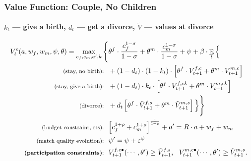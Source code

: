 \documentclass[aspectratio=169]{beamer}
\DeclareMathOperator{\E}{\mathbb{E}}
\begin{document}
\begin{frame}
\frametitle{Value Function: Couple, No Children}
\framesubtitle{$k_t$ --- give a birth, $d_t$ --- get a divorce, $\tilde{V}$ --- values at divorce}
\begin{align*}
V^{c}_t(a,w_f,w_m,\psi,\theta) = \max\limits_{c_f,c_m,a',k} \Bigg\{ & \theta^f \cdot \frac{c_f^{1-\sigma}}{{1-\sigma}}  + \theta^m \cdot \frac{c_m^{1-\sigma}}{1-\sigma}  + \psi + \beta \cdot \E_t \Big\{   \\
\text{ \footnotesize (stay, no birth): \ } & + (1-d_t) \cdot (1-k_t) \cdot  \left[ \theta^f \cdot  V^{f,c}_{t+1} + \theta^m \cdot V^{m,c}_{t+1}  \right] \\
\text{ \footnotesize (stay, give a birth): \ } &  + (1-d_t) \cdot k_t \cdot  \left[ \theta^f \cdot  V^{f,ck}_{t+1} + \theta^m \cdot V^{m,ck}_{t+1}  \right]  \\
\text{ \footnotesize (divorce): \ } & + d_t  \left[ \theta^f \cdot  \tilde{V}^{f,s}_{t+1} + \theta^m \cdot \tilde{V}^{m,s}_{t+1}  \right]  \Big\} \Bigg\}\\
\text{ \footnotesize (budget constraint, rts): \ } &{\normalsize \left[c_f^{1+\rho} + c_m^{1+\rho}\right]^{\frac1{1+\rho}} + a' = R\cdot a + w_f + w_m}\\
\text{ \footnotesize (match quality evolution): \ } &{\normalsize \psi' = \psi + \varepsilon^{\psi}}\\
\text{ \footnotesize \textbf{(participation constraints)}: \ } &{\normalsize V^{f,c\bullet}_{t+1} (\cdots,\theta') \geq \tilde{V}^{f,s}_{t+1}, \ \ V^{m,c\bullet}_{t+1} (\cdots,\theta') \geq \tilde{V}^{m,s}_{t+1}.}\\
\end{align*}
\end{frame}
\end{document}
